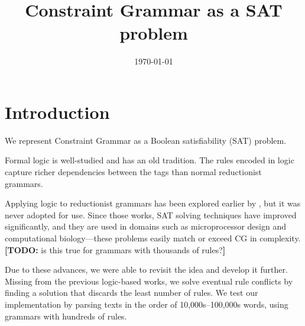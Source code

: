 \documentclass[11pt]{article}
\title{Constraint Grammar as a SAT problem}
\date{\today}
\newcommand{\todo}[1]{{\color{cyan}\textbf{[TODO: }#1\textbf{]}}}
\begin{document}
\maketitle



\section{Introduction}

We represent Constraint Grammar \cite{karlsson1995constraint} 
as a Boolean satisfiability (SAT) problem.

Formal logic is well-studied and has an old tradition.
The rules encoded in logic capture richer dependencies between the
tags than normal reductionist grammars.

Applying logic to reductionist grammars has been explored earlier by 
\cite{lager98,lager_nivre01}, but it was never adopted for use.
Since those works, SAT solving techniques have improved significantly, and 
they are used in domains such as microprocessor design and computational 
biology---these problems easily match or exceed CG in complexity. 
\todo{is this true for grammars with thousands of rules?}

Due to these advances, we were able to revisit the idea and develop it further. 
Missing from the previous logic-based works, 
we solve eventual rule conflicts by finding a solution that 
discards the least number of rules.
We test our implementation by parsing texts in the order of 10,000s--100,000s
words, using grammars with hundreds of rules.





\end{document}
